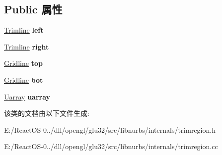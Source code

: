 \subsection*{Public 属性}
\begin{DoxyCompactItemize}
\item 
\mbox{\label{class_trim_region_a8bb8b450e12e2356f5fcd0c5aca4b236}} 
\hyperlink{class_trimline}{Trimline} {\bfseries left}
\item 
\mbox{\label{class_trim_region_a83e611abd7c0127d3307e144067a3b97}} 
\hyperlink{class_trimline}{Trimline} {\bfseries right}
\item 
\mbox{\label{class_trim_region_ab323071b7d7b3cea26caac708f2da295}} 
\hyperlink{struct_gridline}{Gridline} {\bfseries top}
\item 
\mbox{\label{class_trim_region_a4816ce702980637970dabd12371c393b}} 
\hyperlink{struct_gridline}{Gridline} {\bfseries bot}
\item 
\mbox{\label{class_trim_region_a83f933ad3d46bdb7dac8363721a3a704}} 
\hyperlink{class_uarray}{Uarray} {\bfseries uarray}
\end{DoxyCompactItemize}


该类的文档由以下文件生成\+:\begin{DoxyCompactItemize}
\item 
E\+:/\+React\+O\+S-\/0../dll/opengl/glu32/src/libnurbs/internals/trimregion.\+h\item 
E\+:/\+React\+O\+S-\/0../dll/opengl/glu32/src/libnurbs/internals/trimregion.\+cc\end{DoxyCompactItemize}

